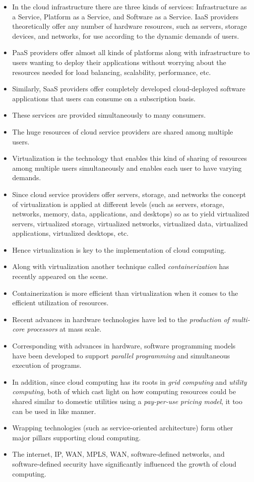\documentclass[a4paper, 12pt]{article}
\begin{document}
\begin{itemize}
\item
In the cloud infrastructure there are three kinds of services: Infrastructure as a Service, Platform as a Service, and Software as a Service. IaaS providers theoretically offer any number of hardware resources, such as servers, storage devices, and networks, for use according to the dynamic demands of users.
\item
PaaS providers offer almost all kinds of platforms along with infrastructure to users wanting to deploy their applications without worrying about the resources needed for load balancing, scalability, performance, etc.
\item
Similarly, SaaS providers offer completely developed cloud-deployed software applications that users can consume on a subscription basis.
\item
These services are provided simultaneously to many consumers.
\item
The huge resources of cloud service providers are shared among multiple users.
\item
Virtualization is the technology that enables this kind of sharing of resources among multiple users simultaneously and enables each user to have varying demands.
\item
Since cloud service providers offer servers, storage, and networks the concept of virtualization is applied at different levels (such as servers, storage, networks, memory, data, applications, and desktops) so as to yield virtualized servers, virtualized storage, virtualized networks, virtualized data, virtualized applications, virtualized desktops, etc.
\item
Hence virtualization is key to the implementation of cloud computing.
\item
Along with virtualization another technique called \textit{containerization} has recently appeared on the scene.
\item
Containerization is more efficient than virtualization when it comes to the efficient utilization of resources.
\item
Recent advances in hardware technologies have led to the \textit{production of multi-core processors} at mass scale.
\item
Corresponding with advances in hardware, software programming models have been developed to support \textit{parallel programming} and simultaneous execution of programs.
\item
In addition, since cloud computing has its roots in \textit{grid computing} and \textit{utility computing}, both of which cast light on how computing resources could be shared similar to domestic utilities using a \textit{pay-per-use pricing model}, it too can be used in like manner.
\item
Wrapping technologies (such as service-oriented architecture) form other major pillars supporting cloud computing.
\item
The internet, IP, WAN, MPLS, WAN, software-defined networks, and software-defined security have significantly influenced the growth of cloud computing.
\end{itemize}
\end{document}
